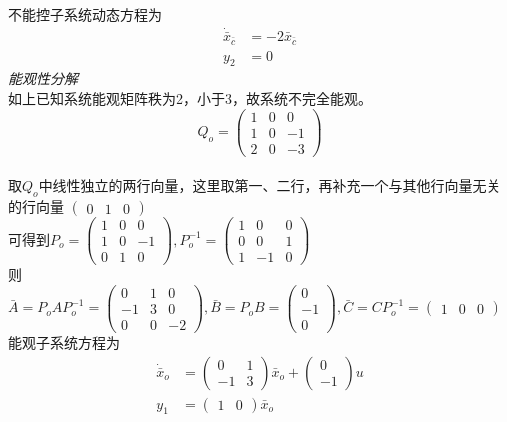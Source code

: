 \documentclass{article}
\begin{document}
不能控子系统动态方程为
\begin{align*}
\dot{\bar{x}}_{\bar{c}} &= -2\bar{x}_{\bar{c}} \\
y_{2} &= 0
\end{align*}
\emph{能观性分解}\\
如上已知系统能观矩阵秩为2，小于3，故系统不完全能观。\\
$$ Q_{o}= \left(\begin{array}{ccc} 1 & 0 & 0\\ 1 & 0 & -1\\ 2 & 0 & -3 \end{array}\right)$$ \\
取$Q_{o}$中线性独立的两行向量，这里取第一、二行，再补充一个与其他行向量无关的行向量 $\left(\begin{array}{ccc} 0 & 1 & 0 \end{array}\right)$ \\
可得到$ P_{o}= \left(\begin{array}{ccc} 1 & 0 & 0\\ 1 & 0 & -1\\ 0 & 1 & 0 \end{array}\right), P_{o}^{-1}=\left(\begin{array}{ccc} 1 & 0 & 0\\ 0 & 0 & 1\\ 1 & -1 & 0 \end{array}\right)$ \\
则$ \bar{A}=P_{o}AP_{o}^{-1}= \left(\begin{array}{ccc} 0 & 1 & 0\\ -1 & 3 & 0\\ 0 & 0 & -2 \end{array}\right),
\bar{B}=P_{o}B= \left(\begin{array}{c} 0\\ -1\\ 0 \end{array}\right),
\bar{C}=CP_{o}^{-1}= \left(\begin{array}{ccc} 1 & 0 & 0 \end{array}\right)$ \\
能观子系统方程为\\
\begin{align*}
\dot{\bar{x}}_{o} &= \left(\begin{array}{cc} 0 & 1\\ -1 & 3 \end{array}\right)\bar{x}_{o}+\left(\begin{array}{c} 0\\ -1 \end{array}\right)u \\
y_1 &= \left(\begin{array}{cc} 1 & 0 \end{array}\right)\bar{x}_o
\end{align*}
\end{document}
